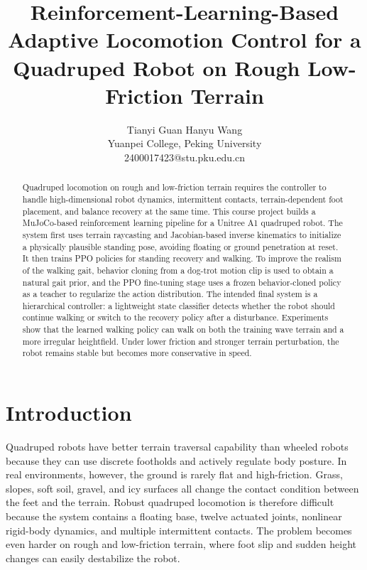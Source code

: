 \documentclass[conference]{IEEEtran}
\begin{document}
\title{Reinforcement-Learning-Based Adaptive Locomotion Control for a Quadruped Robot on Rough Low-Friction Terrain}
\author{Tianyi Guan \quad Hanyu Wang\\
Yuanpei College, Peking University\\
2400017423@stu.pku.edu.cn}

\maketitle

\begin{abstract}
Quadruped locomotion on rough and low-friction terrain requires the controller to handle high-dimensional robot dynamics, intermittent contacts, terrain-dependent foot placement, and balance recovery at the same time. This course project builds a MuJoCo-based reinforcement learning pipeline for a Unitree A1 quadruped robot. The system first uses terrain raycasting and Jacobian-based inverse kinematics to initialize a physically plausible standing pose, avoiding floating or ground penetration at reset. It then trains PPO policies for standing recovery and walking. To improve the realism of the walking gait, behavior cloning from a dog-trot motion clip is used to obtain a natural gait prior, and the PPO fine-tuning stage uses a frozen behavior-cloned policy as a teacher to regularize the action distribution. The intended final system is a hierarchical controller: a lightweight state classifier detects whether the robot should continue walking or switch to the recovery policy after a disturbance. Experiments show that the learned walking policy can walk on both the training wave terrain and a more irregular heightfield. Under lower friction and stronger terrain perturbation, the robot remains stable but becomes more conservative in speed.
\end{abstract}

\section{Introduction}
Quadruped robots have better terrain traversal capability than wheeled robots because they can use discrete footholds and actively regulate body posture. In real environments, however, the ground is rarely flat and high-friction. Grass, slopes, soft soil, gravel, and icy surfaces all change the contact condition between the feet and the terrain. Robust quadruped locomotion is therefore difficult because the system contains a floating base, twelve actuated joints, nonlinear rigid-body dynamics, and multiple intermittent contacts. The problem becomes even harder on rough and low-friction terrain, where foot slip and sudden height changes can easily destabilize the robot.
\end{document}
